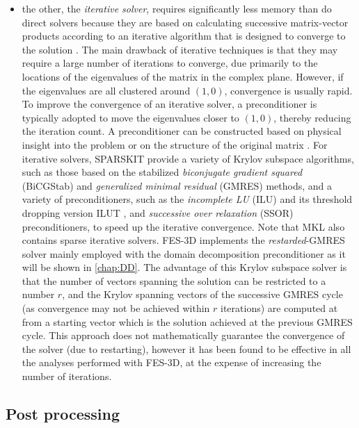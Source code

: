 \begin{itemize}
\item the other, the \textit{iterative solver}, requires significantly less memory than do direct solvers because they are based on calculating successive matrix-vector products according to an iterative algorithm that is designed to converge to the solution \cite{saad2000iterative}. The main drawback of iterative techniques is that they may require a large number of iterations to converge, due primarily to the locations of the eigenvalues of the matrix in the complex plane. However, if the eigenvalues are all clustered around $(1, 0)$, convergence is usually rapid. To improve the convergence of an iterative solver, a preconditioner is typically adopted to move the eigenvalues closer to $(1, 0)$, thereby reducing the iteration count. A preconditioner can be constructed based on physical insight into the problem \cite{greif2007preconditioners} or on the structure of the original matrix \cite{kechroud2004preconditioning}. For iterative solvers, SPARSKIT \cite{saad1994sparsekit} provide a variety of Krylov subspace algorithms, such as those based on the stabilized \textit{biconjugate gradient squared} (BiCGStab) and \textit{generalized minimal residual} (GMRES) methods, and a variety of preconditioners, such as the \textit{incomplete LU} (ILU) and its threshold dropping version ILUT \cite{saad1994ilut}, and \textit{successive over relaxation} (SSOR) preconditioners, to speed up the iterative convergence. Note that MKL also contains sparse iterative solvers. FES-3D implements the \textit{restarded}-GMRES solver \cite{barrett1994templates} mainly employed with the domain decomposition preconditioner as it will be shown in \ref{chap:DD}. The advantage of this Krylov subspace solver is that the number of vectors spanning the solution can be restricted to a  number $r$, and the Krylov spanning vectors of the successive GMRES cycle (as convergence may not be achieved within $r$ iterations) are computed at from a starting vector which is the solution achieved at the previous GMRES cycle. This approach does not mathematically guarantee the convergence of the solver (due to restarting), however it has been found to be effective in all the analyses performed with FES-3D, at the expense of increasing the number of iterations.
\end{itemize}


\subsection{Post processing}

